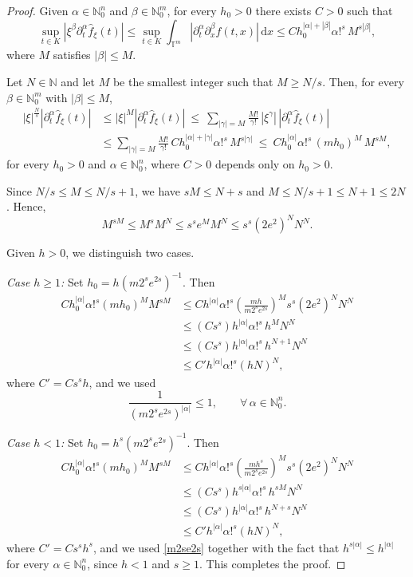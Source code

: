 \documentclass[11pt,reqno]{amsart}
\numberwithin{equation}{section}
\begin{document}
\begin{proof}
	Given \(\alpha\in\mathbb{N}_0^n\) and \(\beta\in\mathbb{N}_0^m\), for every \(h_0>0\) there exists \(C>0\) such that
	\[
	\sup_{t\in K}|\xi^\beta\partial_t^\alpha\widehat{f}_\xi(t)|
	\leq
	\sup_{t\in K}\int_{\mathbb{T}^m}|\partial_t^\alpha\partial_x^\beta f(t,x)|\,\mathrm{d}x
	\leq
	Ch_0^{|\alpha|+|\beta|}\alpha!^s\, M^{s|\beta|},
	\]
	where \(M\) satisfies \(|\beta|\leq M\).
	
	Let \(N\in\mathbb{N}\) and let \(M\) be the smallest integer such that \(M\geq N/s\).
	Then, for every \(\beta\in\mathbb{N}_0^m\) with \(|\beta|\leq M\),
	\begin{align*}
		|\xi|^{\frac{N}{s}}|\partial_t^\alpha\widehat{f}_\xi(t)|
		&\leq
		|\xi|^M|\partial_t^\alpha \widehat{f}_\xi(t)|\ \leq\ 
		\sum_{|\gamma|=M}\frac{M!}{\gamma!}\,|\xi^\gamma|\,|\partial_t^\alpha\widehat{f}_\xi(t)|\\
		&\leq
		\sum_{|\gamma|=M}\frac{M!}{\gamma!}\, Ch_0^{|\alpha|+|\gamma|}\alpha!^s\, M^{s|\gamma|}\ \leq\
		Ch_0^{|\alpha|}\alpha!^s\,(mh_0)^M\, M^{sM},
	\end{align*}
	for every \(h_0>0\) and \(\alpha\in\mathbb{N}_0^n\), where \(C>0\) depends only on \(h_0>0\).
	
	Since \(N/s\leq M\leq N/s+1\), we have \(sM\leq N+s\) and \(M\leq N/s+1\leq N+1\leq 2N\). Hence,
	\[
	M^{sM}\leq M^{s}M^N \leq s^s e^M M^N \leq s^s(2e^{2})^{N}N^N.
	\]
	
	Given \(h>0\), we distinguish two cases.
	
	\smallskip
	\noindent\emph{Case \(h\geq 1\):}
	Set \(h_0=h(m2^se^{2s})^{-1}\). Then
	\begin{align*}
		Ch_0^{|\alpha|}\alpha!^s(mh_0)^M M^{sM}
		&\leq
		Ch^{|\alpha|}\alpha!^s\left(\frac{mh}{m2^se^{2s}}\right)^M s^s(2e^{2})^{N}N^N\\
		&\leq
		(Cs^s)h^{|\alpha|}\alpha!^s\, h^{M} N^N\\
		&\leq
		(Cs^s)h^{|\alpha|}\alpha!^s\, h^{N+1} N^N\\
		&\leq
		C'h^{|\alpha|}\alpha!^s (hN)^{N},
	\end{align*}
	where \(C'=Cs^sh\), and we used
	\begin{equation}\label{m2se2s} 
		\frac{1}{(m2^se^{2s})^{|\alpha|}}\leq 1,\qquad\forall\,\alpha\in\mathbb{N}_0^n.
	\end{equation}
	
	\smallskip
	\noindent\emph{Case \(h<1\):}
	Set \(h_0=h^s(m2^se^{2s})^{-1}\). Then
	\begin{align*}
		Ch_0^{|\alpha|}\alpha!^s(mh_0)^M M^{sM}
		&\leq
		Ch^{|\alpha|}\alpha!^s\left(\frac{mh^s}{m2^se^{2s}}\right)^M s^s(2e^{2})^{N}N^N\\
		&\leq
		(Cs^s)h^{s|\alpha|}\alpha!^s\, h^{sM} N^N\\
		&\leq
		(Cs^s)h^{|\alpha|}\alpha!^s\, h^{N+s} N^N\\
		&\leq
		C'h^{|\alpha|}\alpha!^s (hN)^{N},
	\end{align*}
	where \(C'=Cs^sh^s\), and we used \eqref{m2se2s} together with the fact that
	\(h^{s|\alpha|}\leq h^{|\alpha|}\) for every \(\alpha\in\mathbb{N}_0^n\), since \(h<1\) and \(s\geq 1\).
	This completes the proof.
\end{proof}
\end{document}
